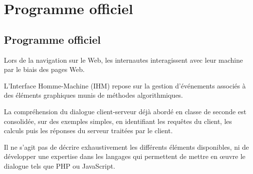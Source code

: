 \chapter*{Programme officiel}

\section*{Programme officiel}

Lors de la navigation sur le Web, les internautes interagissent avec leur machine par le biais des pages Web.

L'Interface Homme-Machine (IHM) repose sur la gestion d'événements associés à des éléments graphiques munis de méthodes algorithmiques.

La compréhension du dialogue client-serveur déjà abordé en classe de seconde est consolidée, sur des exemples simples, en identifiant les requêtes du client, les calculs puis les réponses du serveur traitées par le client.

Il ne s'agit pas de décrire exhaustivement les différents éléments disponibles, ni de développer une expertise dans les langages qui permettent de mettre en œuvre le dialogue tels que PHP ou JavaScript.

